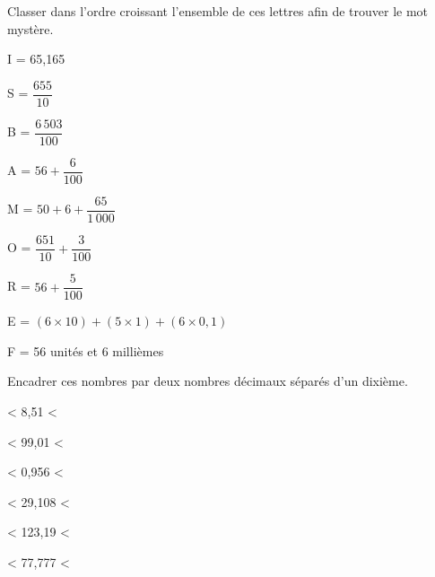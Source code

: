 \begin{colonne*exercice}
\begin{exercice} %
   Classer dans l'ordre croissant l'ensemble de ces lettres afin de trouver le mot mystère.
   \begin{colitemize}{3}
      \item I = 65,165
      \item S = $\dfrac{655}{10}$
      \item B = $\dfrac{6\,503}{100}$
   \end{colitemize}
   \begin{colitemize}{2}
      \item A = $56+\dfrac{6}{100}$
      \item M = $50+6+\dfrac{65}{1\,000}$
      \item O = $\dfrac{651}{10}+\dfrac{3}{100}$
      \item R = $56+\dfrac{5}{100}$
   \end{colitemize}
   \begin{colitemize}{1}
      \item E = $(6\times10)+(5\times1)+(6\times0,1)$
      \item F = 56 unités et 6 millièmes
   \end{colitemize}
\end{exercice}
%

\medskip

\begin{exercice} %
   Encadrer ces nombres par deux nombres décimaux séparés d'un dixième.
   \begin{colenumerate}{2}
      \item \pfh < 8,51 < \pfh
      \item \pfh < 99,01 < \pfh
      \item \pfh < 0,956 < \pfh
      \item \pfh < 29,108 < \pfh
      \item \pfh < 123,19 < \pfh
      \item \pfh < 77,777 < \pfh
   \end{colenumerate}
\end{exercice}


\end{colonne*exercice}
